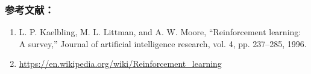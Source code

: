 \subsubsection{参考文献：}
\begin{enumerate}
\item L. P. Kaelbling, M. L. Littman, and A. W. Moore, “Reinforcement learning: A survey,” Journal of artificial intelligence research, vol. 4, pp. 237–285, 1996.
\item \href{https://en.wikipedia.org/wiki/Reinforcement\%5C_learning}{https://en.wikipedia.org/wiki/Reinforcement\_learning}
\end{enumerate}
